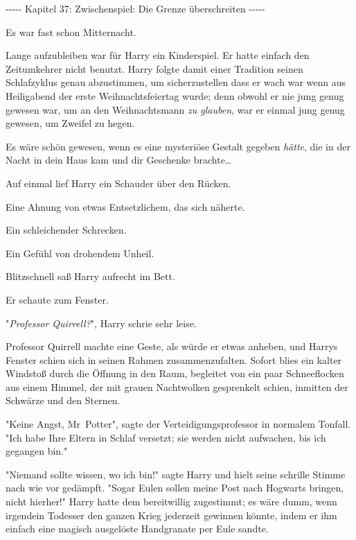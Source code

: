 

\hypertarget{zwischenspiel-die-grenze-uxfcberschreiten}{%

-\/-\/-\/-\/- Kapitel 37: Zwischenspiel: Die Grenze überschreiten -\/-\/-\/-\/-

Es war fast schon Mitternacht.

Lange aufzubleiben war für Harry ein Kinderspiel. Er hatte einfach den Zeitumkehrer nicht benutzt. Harry folgte damit einer Tradition seinen Schlafzyklus genau abzustimmen, um sicherzustellen dass er wach war wenn aus Heiligabend der erste Weihnachtsfeiertag wurde; denn obwohl er nie jung genug gewesen war, um an den Weihnachtsmann \emph{zu glauben}, war er einmal jung genug gewesen, um Zweifel zu hegen.

Es wäre schön gewesen, wenn es eine mysteriöse Gestalt gegeben \emph{hätte}, die in der Nacht in dein Haus kam und dir Geschenke brachte…

Auf einmal lief Harry ein Schauder über den Rücken.

Eine Ahnung von etwas Entsetzlichem, das sich näherte.

Ein schleichender Schrecken.

Ein Gefühl von drohendem Unheil.

Blitzschnell saß Harry aufrecht im Bett.

Er schaute zum Fenster.

"\emph{Professor Quirrell?}", Harry schrie sehr leise.

Professor Quirrell machte eine Geste, als würde er etwas anheben, und Harrys Fenster schien sich in seinen Rahmen zusammenzufalten. Sofort blies ein kalter Windstoß durch die Öffnung in den Raum, begleitet von ein paar Schneeflocken aus einem Himmel, der mit grauen Nachtwolken gesprenkelt schien, inmitten der Schwärze und den Sternen.

"Keine Angst, Mr~Potter", sagte der Verteidigungsprofessor in normalem Tonfall. "Ich habe Ihre Eltern in Schlaf versetzt; sie werden nicht aufwachen, bis ich gegangen bin."

"Niemand sollte wissen, wo ich bin!" sagte Harry und hielt seine schrille Stimme nach wie vor gedämpft. "Sogar Eulen sollen meine Post nach Hogwarts bringen, nicht hierher!" Harry hatte dem bereitwillig zugestimmt; es wäre dumm, wenn irgendein Todesser den ganzen Krieg jederzeit gewinnen könnte, indem er ihm einfach eine magisch ausgelöste Handgranate per Eule sandte.

}
